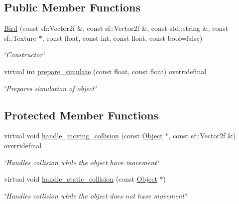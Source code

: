 \subsection*{Public Member Functions}
\begin{DoxyCompactItemize}
\item 
\hyperlink{classBird_afe65295d7e648178245a1cd784924ecd}{Bird} (const sf\+::\+Vector2f \&, const sf\+::\+Vector2f \&, const std\+::string \&, const sf\+::\+Texture $\ast$, const float, const int, const float, const bool=false)
\begin{DoxyCompactList}\small\item\em \char`\"{}\+Constructor\char`\"{} \end{DoxyCompactList}\item 
virtual int \hyperlink{classBird_af2882ba302f03c5bdf5950cc21a39f66}{prepare\+\_\+simulate} (const float, const float) overridefinal
\begin{DoxyCompactList}\small\item\em \char`\"{}\+Prepares simulation of object\char`\"{} \end{DoxyCompactList}\end{DoxyCompactItemize}
\subsection*{Protected Member Functions}
\begin{DoxyCompactItemize}
\item 
virtual void \hyperlink{classBird_a3802ec1a4d2886ef8c95dd6d76038ab6}{handle\+\_\+moving\+\_\+collision} (const \hyperlink{classObject}{Object} $\ast$, const sf\+::\+Vector2f \&) overridefinal
\begin{DoxyCompactList}\small\item\em \char`\"{}\+Handles collision while the object have movement\char`\"{} \end{DoxyCompactList}\item 
virtual void \hyperlink{classBird_adbcfe9b09d3b828ce00982ec1aab9c6e}{handle\+\_\+static\+\_\+collision} (const \hyperlink{classObject}{Object} $\ast$)
\begin{DoxyCompactList}\small\item\em \char`\"{}\+Handles collision while the object does not have movement\char`\"{} \end{DoxyCompactList}\end{DoxyCompactItemize}
